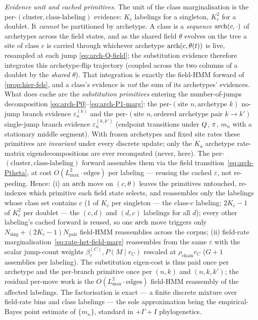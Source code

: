 \emph{Evidence unit and cached primitives.} The unit of the class
marginalisation is the per-$(\text{cluster}, \text{class-labeling})$
evidence: $K_c$ labelings for a singleton, $K_c^2$ for a doublet. It
\emph{cannot} be partitioned by archetype. A class is a \emph{sequence}
$\mathrm{arch}(c,\cdot)$ of archetypes across the field states, and as the shared
field $\theta$ evolves on the tree a site of class $c$ is carried through
whichever archetype $\mathrm{arch}(c,\theta(t))$ is live, resampled at each jump
\eqref{eq:arch-Q-field}; the substitution evidence therefore integrates
this archetype-flip trajectory (coupled across the two columns of a
doublet by the \emph{shared} $\theta$). That integration is exactly the
field-HMM forward of \autoref{prop:hier-fels}, and a class's evidence is
\emph{not} the sum of its archetypes' evidences. What does cache are the
\emph{substitution primitives} entering the number-of-jumps
decomposition \eqref{eq:arch-P0}--\eqref{eq:arch-P1-marg}: the
per-$(\text{site } n, \text{archetype } k)$ no-jump branch evidence
$\varepsilon_n^{(k)}$ and the per-$(\text{site } n, \text{ordered
archetype pair } k{\to}k')$ single-jump branch evidence
$\varepsilon_n^{(k,k')}$ (endpoint transitions under $Q$, $\pi$,
$m_n$ with a stationary middle segment). With frozen archetypes and
fixed site rates these primitives are \emph{invariant} under every
discrete update; only the $K_a$ archetype rate-matrix eigendecompositions
are ever recomputed (never, here). The per-$(\text{cluster},
\text{class-labeling})$ forward assembles them via the field
transition~\eqref{eq:arch-Ptheta}, at cost $O(L_{\max}^2\cdot\text{edges})$
per labeling --- reusing the cached $\varepsilon$, not re-peeling. Hence:
(i) an $\mathrm{arch}$ move on $(c,\theta)$ leaves the primitives untouched, re-
indexes which primitive each field state selects, and reassembles only
the labelings whose class set contains $c$ ($1$ of $K_c$ per singleton
--- the class-$c$ labeling; $2K_c{-}1$ of $K_c^2$ per doublet --- the
$(c,d)$ and $(d,c)$ labelings for all $d$); every other labeling's cached
forward is reused, so one $\mathrm{arch}$ move triggers only
$N_{\text{sing}} + (2K_c{-}1)N_{\text{pair}}$ field-HMM reassemblies
across the corpus; (ii) field-rate marginalisation~\eqref{eq:rate-het-field-marg}
reassembles from the same $\varepsilon$ with the scalar jump-count
weights $\beta^{(C)}_\tau, P(M\mid r_C)$ rescaled at
$\rho_{\text{chain}} r_C$ ($G{+}1$ assemblies per labeling). The
substitution eigen-cost is thus paid once per archetype and the
per-branch primitive once per $(n,k)$ and $(n,k,k')$; the residual
per-move work is the $O(L_{\max}^2\cdot\text{edges})$ field-HMM
reassembly of the affected labelings. The factorisation is exact --- a
finite discrete mixture over field-rate bins and class labelings --- the
sole approximation being the empirical-Bayes point estimate of $\{m_n\}$,
standard in $+\Gamma+I$ phylogenetics.

